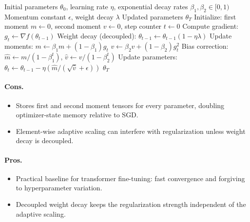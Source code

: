 \begin{algorithm}[H]
\caption{AdamW (Adam with Decoupled Weight Decay)}
\label{alg:adamw}
\begin{algorithmic}[1]
\Require Initial parameters $\theta_0$, learning rate $\eta$, exponential decay rates $\beta_1, \beta_2 \in [0,1)$
\Require Momentum constant $\epsilon$, weight decay $\lambda$
\Ensure Updated parameters $\theta_T$
\State Initialize: first moment $m \gets 0$, second moment $v \gets 0$, step counter $t \gets 0$
    \State Compute gradient: $g_t \gets \nabla f(\theta_{t-1})$
    \State Weight decay (decoupled): $\theta_{t-1} \gets \theta_{t-1}(1 - \eta\lambda)$
    \State Update moments: $m \gets \beta_1 m + (1-\beta_1) g_t$
    \State $v \gets \beta_2 v + (1-\beta_2) g_t^2$
    \State Bias correction: $\hat{m} \gets m / (1 - \beta_1^t)$, $\hat{v} \gets v / (1 - \beta_2^t)$
    \State Update parameters: $\theta_t \gets \theta_{t-1} - \eta (\hat{m} / (\sqrt{\hat{v}} + \epsilon))$
\EndFor
\Return $\theta_T$
\end{algorithmic}
\end{algorithm}

\paragraph{Cons.}
\begin{itemize}[leftmargin=*]
\item Stores first and second moment tensors for every parameter, doubling optimizer-state memory relative to SGD.
\item Element-wise adaptive scaling can interfere with regularization unless weight decay is decoupled.
\end{itemize}

\paragraph{Pros.}
\begin{itemize}[leftmargin=*]
\item Practical baseline for transformer fine-tuning: fast convergence and forgiving to hyperparameter variation.
\item Decoupled weight decay keeps the regularization strength independent of the adaptive scaling.
\end{itemize}

